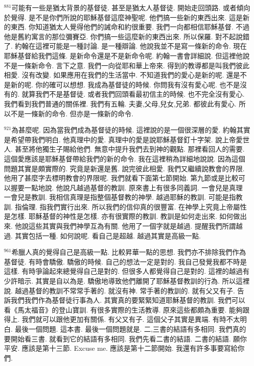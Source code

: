 \documentclass{book}
\begin{document}
$^{881}$可能有一些是猶太背景的基督徒.
甚至是猶太人基督徒.
開始走回頭路.
或者傾向於覺得.
是不是你們所說的耶穌基督這麼神聖呢.
他們搞一些新的東西出來.
這是新的東西.
你知道猶太人覺得他們的誡命和約很重要.
我們一向都相信耶穌基督.
不過他是舊約寓言的那位彌賽亞.
你們搞一些這麼新的東西出來.
所以保羅.
對不起說錯了.
約翰在這裡可能是一種討論.
是一種辯論.
他說我並不是寫一條新的命令.
現在耶穌基督給我們這條.
是新命令還是不是新命令呢.
約翰一書會詳細說.
但這裡他說不是一條新命令.
言下之意.
我們一向從耶和華上帝來.
得到的教導都是叫我們彼此相愛.
沒有改變.
如果應用在我們的生活當中.
不知道我們的愛心是新的呢.
還是不是新的呢.
你的確可以想想.
我成為基督徒的時候.
你問我有沒有愛心呢.
也不是沒有的.
就算我們不是基督徒.
或者我們回頭看最初信主的時候.
也不完全沒有愛心.
我們看到我們普通的關係裡.
我們有五輪.
夫妻,父母,兒女,兄弟.
都彼此有愛心.
所以不是一條新的命令.
但亦是一條新的命令.

$^{921}$為甚麼呢.
因為當我們成為基督徒的時候.
這裡說的是一個很深層的愛.
約翰其實是希望帶我們明白.
他真理中的愛.
真理中的愛是說耶穌基督釘十字架.
說上帝愛世人.
甚至將他獨生子賜給他們.
無意中提升我們去到神的觀點.
那裡看回人的需要.
這個愛應該是耶穌基督帶給我們的新的命令.
我在這裡稍為詳細地說說.
因為這個問題其實是頗實際的.
究竟是新還是舊.
說完彼此相愛.
我們又繼續說教會的界限.
他用了甚麼字去標明教會的界限呢.
我們就看下面第七節開始.
第九節或是比較可以握要一點地說.
他說凡越過基督的教訓.
原來書上有很多同義詞.
一會兒是真理 一會兒是教訓.
我相信真理是指整個基督教的神學.
越過耶穌的教訓.
可能是指教訓.
指倫理.
指我們實行出來.
所以我們的信仰真的很豐富.
在神學上究竟上帝屬性是怎樣.
耶穌基督的神性是怎樣.
亦有很實際的教訓.
教訓是如何走出來.
如何做出來.
他說這些其實與我們神學互為有關.
他用了一個字就是越過.
提醒我們所謂越過.
其實包括一種.
如何說呢.
看自己是超越.
越過其實是高級一點.

$^{961}$希臘人真的覺得自己是高級一點.
比較昇華一點的思想.
我們亦不排除我們作為基督徒.
有時會驕傲.
驕傲的時候.
自己的想法一定是對的.
我自己發覺我都不時是這樣.
有時爭論起來總覺得自己是對的.
但很多人都覺得自己是對的.
這裡的越過有少許暗示.
其實是自以為是.
驕傲地導致他們離開了耶穌基督教訓的行為.
所以這裡說.
越過基督的教訓不常常手著的.
就沒有神.
常手著的教訓的.
就有父又有子.
告訴我們我們作為基督徒行事為人.
其實真的要緊緊知道耶穌基督的教訓.
我們可以看《馬太福音》的登山寶訓.
有很多實際的生活教導.
原來這些都頗為重要.
能夠跟得上.
我們就可以跟他更加有關係.
有父又有子.
這個父子其實是異端.
有時不太明白.
最後一個問題.
這本書.
最後一個問題就是.
二,三書的結語有多相同.
我們真的要開始看三書.
就看到它的結語有多相同.
我們先看二書的結語.
二書的結語.
願你平安.
應該是第十三節.
Excuse me.
應該是第十二節開始.
我還有許多事要寫給你們.
\end{document}
